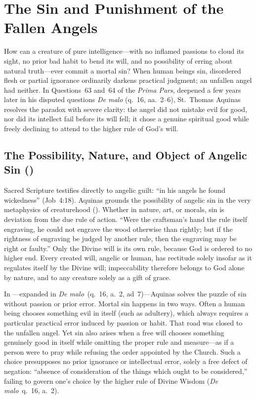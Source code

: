 \section{The Sin and Punishment of the Fallen Angels}\label{sec:st-fall}

How can a creature of pure intelligence---with no inflamed passions to cloud its sight, no prior bad habit to bend its will, and no possibility of erring about natural truth---ever commit a mortal sin? When human beings sin, disordered flesh or partial ignorance ordinarily darkens practical judgment; an unfallen angel had neither. In Questions~63 and~64 of the \emph{Prima Pars}, deepened a few years later in his disputed questions \emph{De malo} (q.~16, aa.~2--6), St.~Thomas Aquinas resolves the paradox with severe clarity: the angel did not mistake evil for good, nor did its intellect fail before its will fell; it chose a genuine spiritual good while freely declining to attend to the higher rule of God's will.

\subsection{The Possibility, Nature, and Object of Angelic Sin ()}

Sacred Scripture testifies directly to angelic guilt: ``in his angels he found wickedness'' (Job~4:18). Aquinas grounds the possibility of angelic sin in the very metaphysics of creaturehood (). Whether in nature, art, or morals, sin is deviation from the due rule of action. ``Were the craftsman's hand the rule itself engraving, he could not engrave the wood otherwise than rightly; but if the rightness of engraving be judged by another rule, then the engraving may be right or faulty.'' Only the Divine will is its own rule, because God is ordered to no higher end. Every created will, angelic or human, has rectitude solely insofar as it regulates itself by the Divine will; impeccability therefore belongs to God alone by nature, and to any creature solely as a gift of grace.

In ---expanded in \emph{De malo}~(q.~16, a.~2, ad~7)---Aquinas solves the puzzle of sin without passion or prior error. Mortal sin happens in two ways. Often a human being chooses something evil in itself (such as adultery), which always requires a particular practical error induced by passion or habit. That road was closed to the unfallen angel. Yet sin also arises when a free will chooses something genuinely good in itself while omitting the proper rule and measure---as if a person were to pray while refusing the order appointed by the Church. Such a choice presupposes no prior ignorance or intellectual error, solely a free defect of negation: ``absence of consideration of the things which ought to be considered,'' failing to govern one's choice by the higher rule of Divine Wisdom (\emph{De malo}~q.~16, a.~2).

